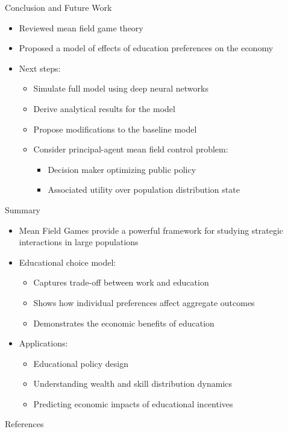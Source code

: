 \documentclass{beamer}
\begin{document}
\begin{frame}{Conclusion and Future Work}
\begin{itemize}
    \item Reviewed mean field game theory
    \item Proposed a model of effects of education preferences on the economy
    \item Next steps:
    \begin{itemize}
        \item Simulate full model using deep neural networks
        \item Derive analytical results for the model
        \item Propose modifications to the baseline model
        \item Consider principal-agent mean field control problem:
        \begin{itemize}
            \item Decision maker optimizing public policy
            \item Associated utility over population distribution state
        \end{itemize}
    \end{itemize}
\end{itemize}
\end{frame}

\begin{frame}{Summary}
\begin{itemize}
    \item Mean Field Games provide a powerful framework for studying strategic interactions in large populations
    \item Educational choice model:
    \begin{itemize}
        \item Captures trade-off between work and education
        \item Shows how individual preferences affect aggregate outcomes
        \item Demonstrates the economic benefits of education
    \end{itemize}
    \item Applications:
    \begin{itemize}
        \item Educational policy design
        \item Understanding wealth and skill distribution dynamics
        \item Predicting economic impacts of educational incentives
    \end{itemize}
\end{itemize}
\end{frame}

\begin{frame}[allowframebreaks]{References}
\tiny{\printbibliography}
\end{frame}
\end{document}
